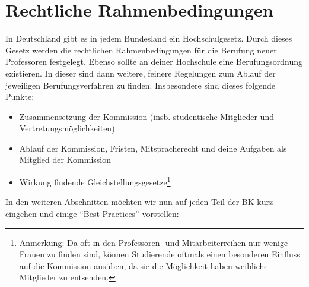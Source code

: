 \section{Rechtliche Rahmenbedingungen}
In Deutschland gibt es in jedem Bundesland ein Hochschulgesetz. Durch dieses Gesetz werden die rechtlichen Rahmenbedingungen für die Berufung neuer Professoren festgelegt. Ebenso sollte an deiner Hochschule eine Berufungsordnung existieren. In dieser sind dann weitere, feinere Regelungen zum Ablauf der jeweiligen Berufungsverfahren zu finden. Insbesondere sind dieses folgende Punkte:
\begin{itemize}
    \item Zusammensetzung der Kommission (insb. studentische Mitglieder und Vertretungsmöglichkeiten)
    \item Ablauf der Kommission, Fristen, Mitspracherecht und deine Aufgaben als Mitglied der Kommission
    \item Wirkung findende Gleichstellungsgesetze\footnote{Anmerkung: Da oft in den Professoren- und Mitarbeiterreihen nur wenige Frauen zu finden sind, können Studierende oftmals einen besonderen Einfluss auf die Kommission ausüben, da sie die Möglichkeit haben weibliche Mitglieder zu entsenden.}
\end{itemize}
In den weiteren Abschnitten möchten wir nun auf jeden Teil der BK kurz eingehen und einige "`Best Practices"' vorstellen:

